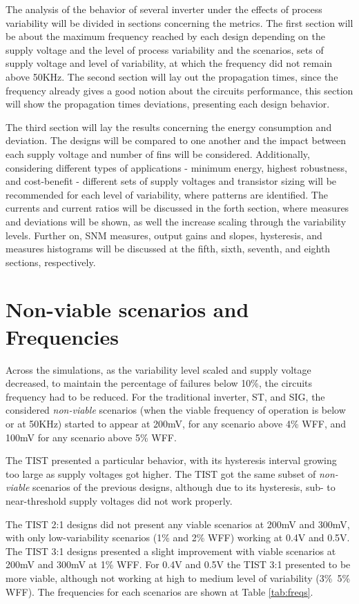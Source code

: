 \documentclass[diss,pgmicro,english]{iiufrgs}
\begin{document}
The analysis of the behavior of several inverter under the effects of process variability will be divided in sections concerning the metrics. The first section will be about the maximum frequency reached by each design depending on the supply voltage and the level of process variability and the scenarios, sets of supply voltage and level of variability, at which the frequency did not remain above 50KHz. The second section will lay out the propagation times, since the frequency already gives a good notion about the circuits performance, this section will show the propagation times deviations, presenting each design behavior.

The third section will lay the results concerning the energy consumption and deviation. The designs will be compared to one another and the impact between each supply voltage and number of fins will be considered. Additionally, considering different types of applications - minimum energy, highest robustness, and cost-benefit - different sets of supply voltages and transistor sizing will be recommended for each level of variability, where patterns are identified. The currents and current ratios will be discussed in the forth section, where measures and deviations will be shown, as well the increase scaling through the variability levels. Further on, SNM measures, output gains and slopes, hysteresis, and measures histograms will be discussed at the fifth, sixth, seventh, and eighth sections, respectively.

\section{Non-viable scenarios and Frequencies}

Across the simulations, as the variability level scaled and supply voltage decreased, to maintain the percentage of failures below 10\%, the circuits frequency had to be reduced. For the traditional inverter, ST, and SIG, the considered \textit{non-viable} scenarios (when the viable frequency of operation is below or at 50KHz) started to appear at 200mV, for any scenario above 4\% WFF, and 100mV for any scenario above 5\% WFF.

The TIST presented a particular behavior, with its hysteresis interval growing too large as supply voltages got higher. The TIST got the same subset of \textit{non-viable} scenarios of the previous designs, although due to its hysteresis, sub- to near-threshold supply voltages did not work properly.

The TIST 2:1 designs did not present any viable scenarios at 200mV and 300mV, with only low-variability scenarios (1\% and 2\% WFF) working at 0.4V and 0.5V. The TIST 3:1 designs presented a slight improvement with viable scenarios at 200mV and 300mV at 1\% WFF. For 0.4V and 0.5V the TIST 3:1 presented to be more viable, although not working at high to medium level of variability (3\%~5\% WFF). The frequencies for each scenarios are shown at Table \ref{tab:freqs}.
\end{document}
